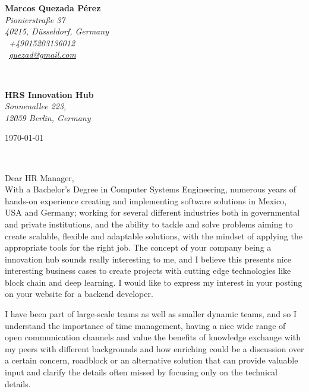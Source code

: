 \documentclass[a4paper,nonstopmode,9.5pt]{article}
\renewcommand{\sffamily}{\rmfamily}
\begin{document}
\sffamily   %
\hfill%
\begin{minipage}[t]{.6\textwidth}
\raggedleft%
{\bfseries Marcos Quezada Pérez}\\[.35ex]
\small\itshape%
Pionierstraße 37\\
40215, Düsseldorf, Germany\\[.35ex]
\Telefon~+49015203136012\\
\Letter~\href{mailto:quezad@gmail.com}{quezad@gmail.com}
\end{minipage}\\[1em]
%
\begin{minipage}[t]{.4\textwidth}
\raggedright%
{\bfseries HRS Innovation Hub}\\[.35ex]
\small\itshape%
Sonnenallee 223,\\
12059 Berlin, Germany
\end{minipage}
\hfill %
\begin{minipage}[t]{.4\textwidth}
\raggedleft %
\today
\end{minipage}\\[2em]
\raggedright
Dear HR Manager,\\[1.5em]
%
With a Bachelor’s Degree in Computer Systems Engineering, numerous years of hands-on experience creating and implementing software solutions in Mexico, USA and Germany; working for several different industries both in governmental and private institutions,
and the ability to tackle and solve problems aiming to create scalable, flexible and adaptable solutions, with the mindset of applying the appropriate tools for the right job. The concept of your company being a innovation hub sounds really interesting to me, 
and I believe this presents nice interesting business cases to create projects with cutting edge technologies like block chain and deep learning. I would like to express my interest in your posting on your website for a backend developer.

I have been part of large-scale teams as well as smaller dynamic teams, and so I understand the importance of time management, having a nice wide range of open communication channels and value the benefits of knowledge exchange with my peers with different backgrounds 
and how enriching could be a discussion over a certain concern, roadblock or an alternative solution that can provide valuable input and clarify the details often missed by focusing only on the technical details. 
\end{document}
